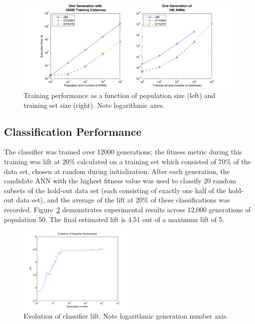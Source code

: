 \documentclass[letterpaper]{jpconf}       %
\begin{document}
\begin{figure}[h]
	\begin{center}
	\includegraphics[width=\textwidth]{fig-performance-genericx86}
	\caption{\label{fig:training-performance}Training performance as a function of population size (left) and training set size (right). Note logarithmic axes.}
	\end{center}
\end{figure}

\subsection{Classification Performance} \label{results}
The classifier was trained over 12000 generations; the fitness metric during this training was lift at 20\% calculated on a training set which consisted of 70\% of the data set, chosen at random during initialization.  After each generation, the candidate ANN with the highest fitness value was used to classify 20 random subsets of the hold-out data set (each consisting of exactly one half of the hold-out data set), and the average of the lift at 20\% of these classifications was recorded.  Figure~\ref{fig:evolution-lift} demonstrates experimental results across 12,000 generations of population 50. The final estimated lift is 4.51 out of a maximum lift of 5.

\begin{figure}[h]
	\begin{center}
	\includegraphics[width=0.5\textwidth]{fig-evolution-lift}
	\caption{\label{fig:evolution-lift}Evolution of classifier lift. Note logarithmic generation number axis.}
	\end{center}
\end{figure}
\end{document}
